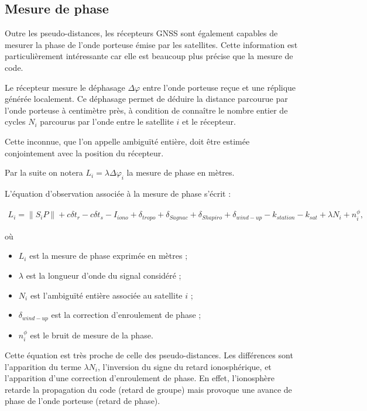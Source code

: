 \subsection{Mesure de phase}

Outre les pseudo-distances, les récepteurs GNSS sont également capables de mesurer la phase de l'onde porteuse émise par les satellites. Cette information est particulièrement intéressante car elle est beaucoup plus précise que la mesure de code. 

Le récepteur mesure le déphasage $\Delta \varphi$ entre l'onde porteuse reçue et une réplique générée localement. Ce déphasage permet de déduire la distance parcourue par l'onde porteuse à centimètre près, à condition de connaître le nombre entier de cycles $N_i$ parcourus par l'onde entre le satellite $i$ et le récepteur.

Cette inconnue, que l'on appelle ambiguïté entière, doit être estimée conjointement avec la position du récepteur.

Par la suite on notera $L_i = \lambda \Delta \varphi_i $ la mesure de phase en mètres.

L'équation d'observation associée à la mesure de phase s'écrit :

\begin{align}
L_i
=
\|S_iP\|
+
c\delta t_r
-
c\delta t_s
-
I_{iono}
+
\delta_{tropo}
+
\delta_{Sagnac}
+
\delta_{Shapiro}
+
\delta_{wind-up}
-
k_{station}
-
k_{sat}
+
\lambda N_i
+
n_i^\phi,
\label{eq:phase}
\end{align}

où

\begin{itemize}
\item $L_i$ est la mesure de phase exprimée en mètres ;
\item $\lambda$ est la longueur d'onde du signal considéré ;
\item $N_i$ est l'ambiguïté entière associée au satellite $i$ ;
\item $\delta_{wind-up}$ est la correction d'enroulement de phase ;
\item $n_i^\phi$ est le bruit de mesure de la phase.
\end{itemize}

Cette équation est très proche de celle des pseudo-distances. Les différences sont l'apparition du terme $\lambda N_i$, l'inversion du signe du retard ionosphérique, et l'apparition d'une correction d'enroulement de phase. En effet, l'ionosphère retarde la propagation du code (retard de groupe) mais provoque une avance de phase de l'onde porteuse (retard de phase).

